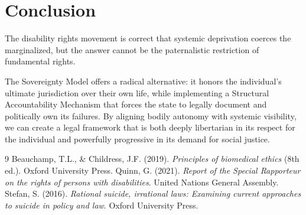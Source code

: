 \documentclass[10pt, twocolumn, letterpaper]{article}
\begin{document}
\section{Conclusion}

The disability rights movement is correct that systemic deprivation coerces the marginalized, but the answer cannot be the paternalistic restriction of fundamental rights. 

The Sovereignty Model offers a radical alternative: it honors the individual's ultimate jurisdiction over their own life, while implementing a Structural Accountability Mechanism that forces the state to legally document and politically own its failures. By aligning bodily autonomy with systemic visibility, we can create a legal framework that is both deeply libertarian in its respect for the individual and powerfully progressive in its demand for social justice.

\begin{thebibliography}{9}
\small
{} Beauchamp, T.L., \& Childress, J.F. (2019). \textit{Principles of biomedical ethics} (8th ed.). Oxford University Press.
 Quinn, G. (2021). \textit{Report of the Special Rapporteur on the rights of persons with disabilities}. United Nations General Assembly.
 Stefan, S. (2016). \textit{Rational suicide, irrational laws: Examining current approaches to suicide in policy and law}. Oxford University Press.
\end{thebibliography}
\end{document}
